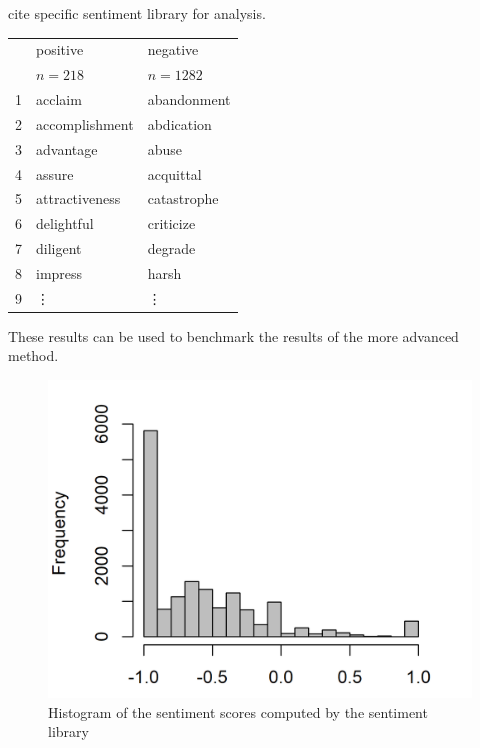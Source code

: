 cite specific sentiment library for analysis.
\begin{table}[ht]
\centering
\begin{tabular}{rll}
  \hline
 & positive & negative \\ 
 & $n = 218$ & $n = 1282$ \\ 
  \hline
  1 & acclaim & abandonment \\ 
  2 & accomplishment & abdication \\ 
  3 & advantage & abuse \\ 
  4 & assure & acquittal \\ 
  5 & attractiveness & catastrophe \\ 
  6 & delightful & criticize \\ 
  7 & diligent & degrade \\ 
  8 & impress & harsh \\ 
  9 & \vdots & \vdots \\ 
   \hline
\end{tabular}
\end{table}
These results can be used to benchmark the results of the more advanced method.
\begin{figure}[h]
\centering
\includegraphics[width=\textwidth]{figures/2SentimentsBOW_Histogram.png}
\caption{Histogram of the sentiment scores computed by the sentiment library}
\label{fig:BoWSentiment}
\end{figure}



